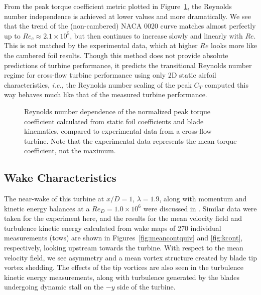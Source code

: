 From the peak torque coefficient metric plotted in
Figure~\ref{fig:foils-C_T-Re-dep}, the Reynolds number independence is achieved
at lower values and more dramatically. We see that the trend of the
(non-cambered) NACA 0020 curve matches almost perfectly up to $Re_c \approx 2.1
\times 10^5$, but then continues to increase slowly and linearly with $Re$. This
is not matched by the experimental data, which at higher $Re$ looks more like
the cambered foil results. Though this method does not provide absolute
predictions of turbine performance, it predicts the transitional Reynolds number
regime for cross-flow turbine performance using only 2D static airfoil
characteristics, \emph{i.e.}, the Reynolds number scaling of the peak $C_T$
computed this way behaves much like that of the measured turbine performance.

\begin{figure}[ht]
\centering


\caption{Reynolds number dependence of the normalized peak torque
    coefficient calculated from static foil coefficients and blade kinematics,
    compared to experimental data from a cross-flow turbine. Note that the
    experimental data represents the mean torque coefficient, not the maximum.}

\label{fig:foils-C_T-Re-dep}
\end{figure}


\subsection{Wake Characteristics}

The near-wake of this turbine at $x/D=1$, $\lambda=1.9$, along with momentum and
kinetic energy balances at a $Re_D = 1.0 \times 10^6$ were discussed in
\cite{Bachant2015-JoT}. Similar data were taken for the experiment here, and the
results for the mean velocity field and turbulence kinetic energy calculated
from wake maps of 270 individual measurements (tows) are shown in
Figures~\ref{fig:meancontquiv} and \ref{fig:kcont}, respectively, looking
upstream towards the turbine. With respect to the mean velocity field, we see
asymmetry and a mean vortex structure created by blade tip vortex shedding. The
effects of the tip vortices are also seen in the turbulence kinetic energy
measurements, along with turbulence generated by the blades undergoing dynamic
stall on the $-y$ side of the turbine.

